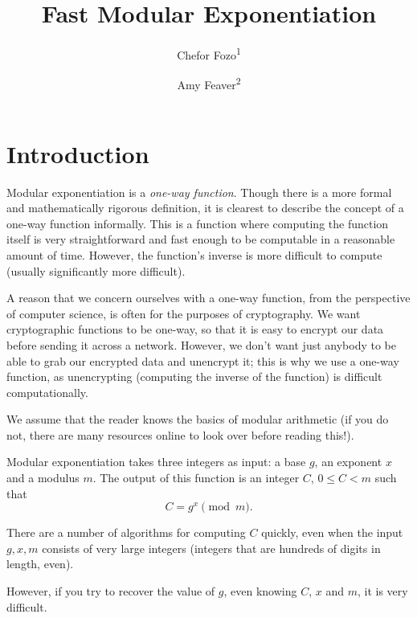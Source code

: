 \documentclass[14pt, letter]{amsart}
\begin{document}
\title{Fast Modular Exponentiation}
\author{Chefor Fozo\textsuperscript{1}}
\address{\textsuperscript{1} Department of Computing Science, The King's University, 9125 50 St NW, Edmonton, AB, Canada}
\author{Amy Feaver\textsuperscript{2}}
\address{\textsuperscript{2} Nomadic Mathematician}

\maketitle

\section{Introduction}

Modular exponentiation is a \textit{one-way function}. Though there is a more formal and mathematically rigorous definition, it is clearest to describe the concept of a one-way function informally. This is a function where computing the function itself is very straightforward and fast enough to be computable in a reasonable amount of time. However, the function's inverse is more difficult to compute (usually significantly more difficult). ~\cite{OneWay}

A reason that we concern ourselves with a one-way function, from the perspective of computer science, is often for the purposes of cryptography. We want cryptographic functions to be one-way, so that it is easy to encrypt our data before sending it across a network. However, we don't want just anybody to be able to grab our encrypted data and unencrypt it; this is why we use a one-way function, as unencrypting (computing the inverse of the function) is difficult computationally.

We assume that the reader knows the basics of modular arithmetic (if you do not, there are many resources online to look over before reading this!).

Modular exponentiation takes three integers as input: a base $g$, an exponent $x$ and a modulus $m$. The output of this function is an integer $C$, $0\leq C<m$ such that 
\[C = g^x\pmod{m}.\]

There are a number of algorithms for computing $C$ quickly, even when the input $g, x, m$ consists of very large integers (integers that are hundreds of digits in length, even).

However, if you try to recover the value of $g$, even knowing $C$, $x$ and $m$, it is very difficult.
\end{document}
